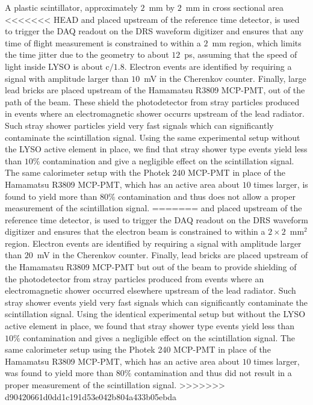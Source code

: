 \documentclass[12pt]{article}
\begin{document}
A plastic scintillator, approximately $2$~mm by $2$~mm in cross sectional area
<<<<<<< HEAD
and placed upstream of the reference time detector, is used to trigger
the DAQ readout on the DRS waveform digitizer and ensures that any
time of flight measurement is constrained to within a $2$~mm region,
which limits the time jitter due to the geometry to about $12$~ps, 
assuming that the speed of light inside LYSO is about $\mathrm{c}/1.8$.
Electron events are identified by requiring a signal with amplitude
larger than $10$~mV in the Cherenkov counter.
Finally, large lead bricks are placed upstream of the Hamamatsu
R3809 MCP-PMT, out of the path of the beam. These shield the photodetector
from stray particles produced in events where an electromagnetic shower
occurrs upstream of the lead radiator. Such stray shower
particles yield very fast signals which can significantly contaminate the
scintillation signal. Using the same experimental setup without the 
LYSO active element in place, we find that stray shower type events yield 
less than $10\%$ contamination and give a negligible effect on the scintillation 
signal. The same calorimeter setup with the Photek 240 MCP-PMT in place of the 
Hamamatsu R3809 MCP-PMT, which has an active area about $10$ times larger, 
is found to yield more than $80\%$ contamination and thus does not allow a proper
measurement of the scintillation signal.
=======
and placed upstream of the reference time detector, is used to trigger the DAQ
readout on the DRS waveform digitizer and ensures that the electron beam is
constrained to within a $2\times 2$~mm$^2$ region. Electron events are
identified by requiring a signal with amplitude larger than $20$~mV in the
Cherenkov counter. Finally, lead bricks are placed upstream of the Hamamatsu
R3809 MCP-PMT but out of the beam to provide shielding of the photodetector from
stray particles produced from events where an electromagnetic shower occurred
elsewhere upstream of the lead radiator. Such stray shower events yield very
fast signals which can significantly contaminate the scintillation signal. Using
the identical experimental setup but without the LYSO active element in place,
we found that stray shower type events yield less than $10\%$ contamination and
gives a negligible effect on the scintillation signal. The same calorimeter
setup using the Photek 240 MCP-PMT in place of the Hamamatsu R3809 MCP-PMT,
which has an active area about $10$ times larger, was found to yield more than
$80\%$ contamination and thus did not result in a proper measurement of the
scintillation signal.
>>>>>>> d90420661d0dd1c191d53e042b804a433b05ebda
\end{document}
